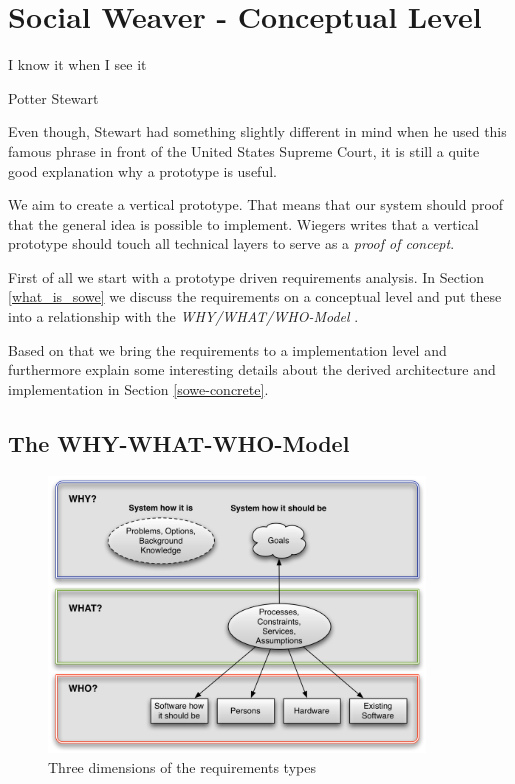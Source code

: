 \section{Social Weaver - Conceptual Level}\label{sowe-abstract}

\epigraph{I know it when I see it}{Potter Stewart}

Even though, Stewart had something slightly different in mind when he used this famous phrase in front of the United States Supreme Court, it is still a quite good explanation why a prototype is useful. 

We aim to create a vertical prototype. That means that our system should proof that the general idea is possible to implement. Wiegers writes that a vertical prototype should touch all technical layers to serve as a \emph{proof of concept}\cite{wiegers2003software}.

First of all we start with a prototype driven requirements analysis. In Section \ref{what_is_sowe}  we discuss the requirements on a conceptual level and put these into a relationship with the \emph{WHY/WHAT/WHO-Model} \cite{van2009requirements}.

Based on that we bring the requirements to a implementation level and furthermore explain some interesting details about the derived architecture and implementation in Section \ref{sowe-concrete}. 

\subsection{The WHY-WHAT-WHO-Model}\label{why-what-who}
\begin{figure}\centering
		\includegraphics[width=10cm]{images/why-what-who-model.png}
		\caption{Three dimensions of the requirements types \cite{van2009requirements}}
		\label{why-what-who-diagram}
\end{figure} 


